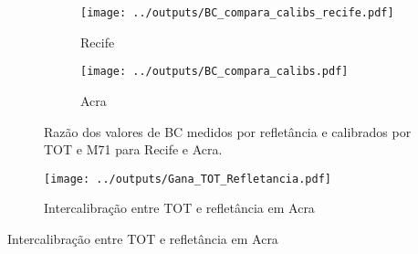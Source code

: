 \begin{figure}[H]
  \centering
  \begin{subfigure}[b]{0.45\linewidth}
    \texttt{[image: ../outputs/BC\_compara\_calibs\_recife.pdf]}
    \caption{Recife}
  \end{subfigure}%
  \hspace{0.3cm}
  \begin{subfigure}[b]{0.45\linewidth}
    \texttt{[image: ../outputs/BC\_compara\_calibs.pdf]}
    \caption{Acra \label{fig:razaoTOTM71}}
  \end{subfigure}
  \caption{Razão dos valores de BC medidos por refletância e calibrados por 
           TOT e M71 para Recife e Acra.}
\end{figure}

\newpage
\begin{figure}[H]
\begin{center}
  \texttt{[image: ../outputs/Gana\_TOT\_Refletancia.pdf]}
  \caption{Intercalibração entre TOT e refletância em Acra}
\end{center}
\end{figure}

\begin{table}[H]
  \centering
  \small
   
   \caption{Intercalibração entre TOT e refletância em Acra}
\end{table} 



